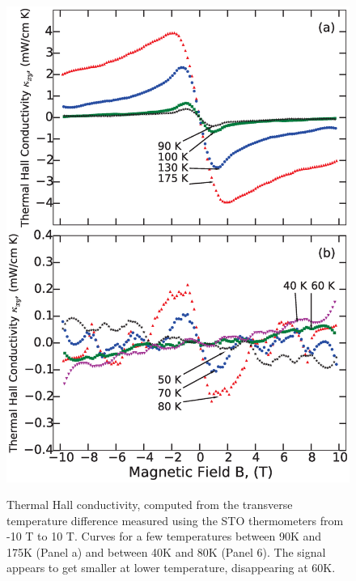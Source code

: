 \documentclass{thesis-umich}
\begin{document}
\begin{figure} \caption[Thermal Hall conductivity of bismuth]{Thermal Hall conductivity, computed from the
    transverse temperature difference measured using the STO thermometers from
    -10 T to 10 T. Curves for a few temperatures between 90K and 175K (Panel a)
    and between 40K and 80K (Panel 6). The signal appears to get smaller at
lower temperature, disappearing at 60K.} \centering\label{kappaxy}
\includegraphics[width=\columnwidth]{figures/kappaxy_apl.eps} \end{figure}
\end{document}
